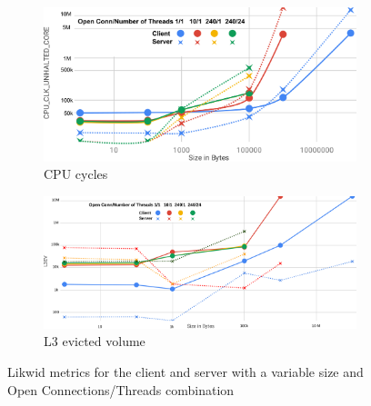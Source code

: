 \documentclass[runningheads]{llncs}
\begin{document}
\begin{figure}[!bt]
    \centering

  \begin{subfigure}[t]{0.7\textwidth}
        \includegraphics[width=1\textwidth]{cuc-to-size.png}\vspace{-0.2em}
        \caption{CPU cycles}\vspace{-0.2em}
		\label{fig:cuc-to-size}
  \end{subfigure}

  \begin{subfigure}[t]{0.7\textwidth}
        \includegraphics[width=1\textwidth]{l3ev-to-size.png}\vspace{-0.2em}
		\caption{L3 evicted volume}\vspace{-0.2em}
		\label{fig:l3ev-to-size}
  \end{subfigure}

\caption{Likwid metrics for the client and server with a variable size and Open Connections/Threads combination}
\end{figure}
\end{document}
